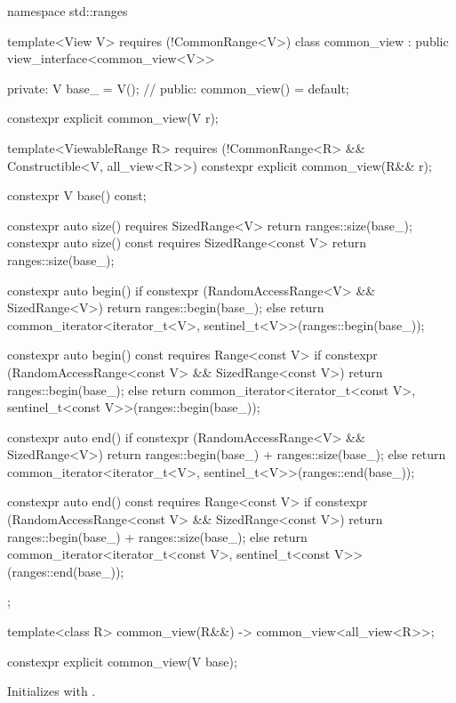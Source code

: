 \begin{codeblock}
namespace std::ranges {
  template<View V>
    requires (!CommonRange<V>)
  class common_view : public view_interface<common_view<V>> {
  private:
    V base_ = V();  // \expos
  public:
    common_view() = default;

    constexpr explicit common_view(V r);

    template<ViewableRange R>
      requires (!CommonRange<R> && Constructible<V, all_view<R>>)
    constexpr explicit common_view(R&& r);

    constexpr V base() const;

    constexpr auto size() requires SizedRange<V> {
      return ranges::size(base_);
    }
    constexpr auto size() const requires SizedRange<const V> {
      return ranges::size(base_);
    }

    constexpr auto begin() {
      if constexpr (RandomAccessRange<V> && SizedRange<V>)
        return ranges::begin(base_);
      else
        return common_iterator<iterator_t<V>, sentinel_t<V>>(ranges::begin(base_));
    }

    constexpr auto begin() const requires Range<const V> {
      if constexpr (RandomAccessRange<const V> && SizedRange<const V>)
        return ranges::begin(base_);
      else
        return common_iterator<iterator_t<const V>, sentinel_t<const V>>(ranges::begin(base_));
    }

    constexpr auto end() {
      if constexpr (RandomAccessRange<V> && SizedRange<V>)
        return ranges::begin(base_) + ranges::size(base_);
      else
        return common_iterator<iterator_t<V>, sentinel_t<V>>(ranges::end(base_));
    }

    constexpr auto end() const requires Range<const V> {
      if constexpr (RandomAccessRange<const V> && SizedRange<const V>)
        return ranges::begin(base_) + ranges::size(base_);
      else
        return common_iterator<iterator_t<const V>, sentinel_t<const V>>(ranges::end(base_));
    }
  };

  template<class R>
    common_view(R&&) -> common_view<all_view<R>>;
}
\end{codeblock}

%
\begin{itemdecl}
constexpr explicit common_view(V base);
\end{itemdecl}

\begin{itemdescr}
\pnum
\effects Initializes  with .
\end{itemdescr}

